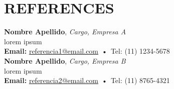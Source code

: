 \documentclass[11pt,a4paper]{article}
\begin{document}
\section*{REFERENCES}
\textbf{Nombre Apellido}, \textit{Cargo, Empresa A}\\
lorem ipsum \\
\textbf{Email:} \href{mailto:referencia1@email.com}{referencia1@email.com} \,•\, Tel: (11) 1234-5678
\vspace{8pt} \\
\textbf{Nombre Apellido}, \textit{Cargo, Empresa B}\\
lorem ipsum \\
\textbf{Email:} \href{mailto:referencia2@email.com}{referencia2@email.com} \,•\, Tel: (11) 8765-4321
\end{document}
